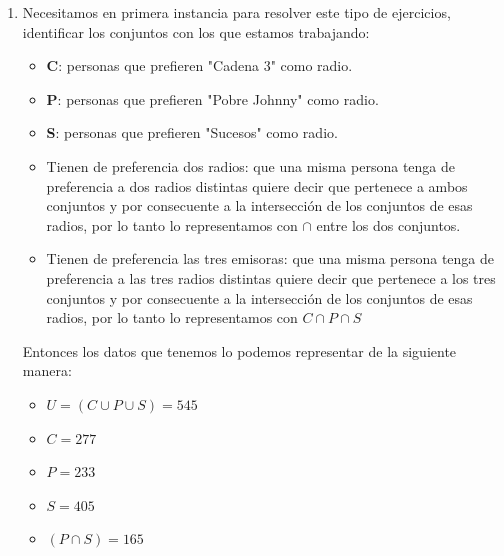 \documentclass[12pt]{article}
\begin{document}
\begin{enumerate}
\begin{enumerate}
\begin{itemize}
            \item $\left(c \vee a\right)$ es Verdadero, conociendo que $a$ es falsa y por los valores de verdad de la tabla de disyunción, entonces para que esta proposición sea verdadera entonces al menos una debe ser verdadera, por lo tanto $c$ es verdadera.
        \end{itemize}
        Resultan entonces que $a$ es Falsa, $b$ es Falsa y $c$ es Verdadera.
    \end{enumerate}
    \item Necesitamos en primera instancia para resolver este tipo de ejercicios, identificar los conjuntos con los que estamos trabajando:
        \begin{itemize}
            \item \textbf{C}: personas que prefieren "Cadena 3" como radio.
            \item \textbf{P}: personas que prefieren "Pobre Johnny" como radio.
            \item \textbf{S}: personas que prefieren "Sucesos" como radio.
        \end{itemize}
        \begin{itemize}
            \item Tienen de preferencia dos radios: que una misma persona tenga de preferencia a dos radios distintas quiere decir que pertenece a ambos conjuntos y por consecuente a la intersección de los conjuntos de esas radios, por lo tanto lo representamos con $\cap$ entre los dos conjuntos.
            \item Tienen de preferencia las tres emisoras: que una misma persona tenga de preferencia a las tres radios distintas quiere decir que pertenece a los tres conjuntos y por consecuente a la intersección de los conjuntos de esas radios, por lo tanto lo representamos con $C\cap P \cap S$
        \end{itemize}
        Entonces los datos que tenemos lo podemos representar de la siguiente manera:
        \begin{itemize}
            \item $U=(C\cup P\cup S)=545$
            \item $C=277$
            \item $P=233$
            \item $S=405$
            \item $(P\cap S)=165$

\end{itemize}
\end{enumerate}
\end{document}
